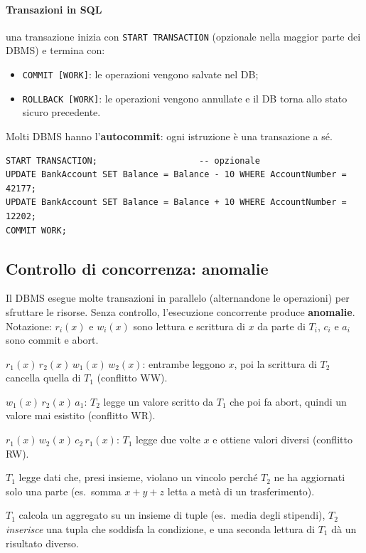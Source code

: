 \documentclass[a4paper,12pt]{article}
\begin{document}
\paragraph{Transazioni in SQL} una transazione inizia con \texttt{START
TRANSACTION} (opzionale nella maggior parte dei DBMS) e termina con:
\begin{itemize}
  \item \texttt{COMMIT [WORK]}: le operazioni vengono salvate nel DB;
  \item \texttt{ROLLBACK [WORK]}: le operazioni vengono annullate e il DB torna
    allo stato sicuro precedente.
\end{itemize}
Molti DBMS hanno l'\textbf{autocommit}: ogni istruzione è una transazione a sé.
\begin{verbatim}
START TRANSACTION;                    -- opzionale
UPDATE BankAccount SET Balance = Balance - 10 WHERE AccountNumber = 42177;
UPDATE BankAccount SET Balance = Balance + 10 WHERE AccountNumber = 12202;
COMMIT WORK;
\end{verbatim}

\subsection{Controllo di concorrenza: anomalie}

Il DBMS esegue molte transazioni in parallelo (alternandone le operazioni) per
sfruttare le risorse. Senza controllo, l'esecuzione concorrente produce
\textbf{anomalie}. Notazione: $r_i(x)$ e $w_i(x)$ sono lettura e scrittura
di $x$ da parte di $T_i$, $c_i$ e $a_i$ sono commit e abort.
\begin{description}[style=nextline]
  \item[Perdita di aggiornamento (lost update)] $r_1(x)\, r_2(x)\, w_1(x)\,
    w_2(x)$: entrambe leggono $x$, poi la scrittura di $T_2$ cancella quella di
    $T_1$ (conflitto WW).
  \item[Lettura sporca (dirty read)] $w_1(x)\, r_2(x)\, a_1$: $T_2$ legge un
    valore scritto da $T_1$ che poi fa abort, quindi un valore mai esistito
    (conflitto WR).
  \item[Letture inconsistenti (non ripetibili)] $r_1(x)\, w_2(x)\, c_2\,
    r_1(x)$: $T_1$ legge due volte $x$ e ottiene valori diversi (conflitto RW).
  \item[Aggiornamento fantasma] $T_1$ legge dati che, presi insieme, violano un
    vincolo perché $T_2$ ne ha aggiornati solo una parte (es.\ somma $x+y+z$
    letta a metà di un trasferimento).
  \item[Inserimento fantasma] $T_1$ calcola un aggregato su un insieme di tuple
    (es.\ media degli stipendi), $T_2$ \emph{inserisce} una tupla che soddisfa
    la condizione, e una seconda lettura di $T_1$ dà un risultato diverso.
\end{description}
\end{document}

